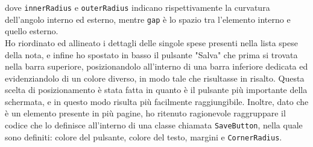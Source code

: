 \noindent dove \texttt{innerRadius} e \texttt{outerRadius} indicano rispettivamente la curvatura dell'angolo interno ed esterno, mentre \texttt{gap} è lo spazio tra l'elemento interno e quello esterno.\\
Ho riordinato ed allineato i dettagli delle singole spese presenti nella lista spese della nota, e infine ho spostato in basso il pulsante "Salva" che prima si trovata nella barra superiore, posizionandolo all'interno di una barra inferiore dedicata ed evidenziandolo di un colore diverso, in modo tale che risultasse in risalto. Questa scelta di posizionamento è stata fatta in quanto è il pulsante più importante della schermata, e in questo modo risulta più facilmente raggiungibile. Inoltre, dato che è un elemento presente in più pagine, ho ritenuto ragionevole raggruppare il codice che lo definisce all'interno di una classe chiamata \texttt{SaveButton}, nella quale sono definiti: colore del pulsante, colore del testo, margini e \texttt{CornerRadius}.

